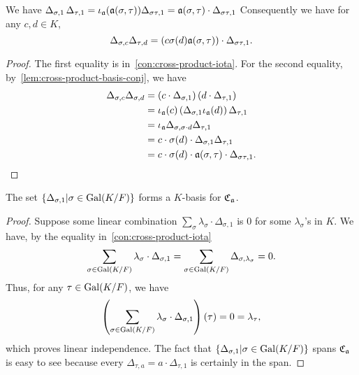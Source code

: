  \begin{lemma}\label{lem:cross-product-basis-mul}
   We have $\Delta_{\sigma,1}\,\Delta_{\tau,1} = \iota_{\mathfrak{a}}(\mathfrak{a}(\sigma,\tau))\Delta_{\sigma\tau,1} = \mathfrak{a}(\sigma,\tau)\cdot\Delta_{\sigma\tau,1}$
   Consequently we have for any $c, d \in K$,
   \[
     \Delta_{\sigma, c}\Delta_{\tau,d} = \left(c \sigma(d)\mathfrak{a}(\sigma,\tau)\right) \cdot \Delta_{\sigma\tau, 1}.
   \]
   \leanok
 \end{lemma}
 \begin{proof}
   The first equality is in~\cref{con:cross-product-iota}.
   For the second equality, by~\cref{lem:cross-product-basis-conj}, we have
   \[
     \begin{aligned}
       \Delta_{\sigma,c}\Delta_{\sigma,d}
       &= \left(c\cdot\Delta_{\sigma, 1}\right)\left(d\cdot\Delta_{\tau,1}\right) \\
       &= \iota_{\mathfrak{a}}(c)\left(\Delta_{\sigma, 1}\iota_{\mathfrak{a}}(d)\right)\Delta_{\tau, 1} \\
       &= \iota_{\mathfrak{a}}\Delta_{\sigma, \sigma \cdot d}\Delta_{\tau, 1}\\
       &= c \cdot \sigma(d) \cdot \Delta_{\sigma, 1}\Delta_{\tau, 1} \\
       &= c \cdot \sigma(d)\cdot\mathfrak{a}(\sigma,\tau)\cdot\Delta_{\sigma\tau,1}.\\
     \end{aligned}
   \]
 \end{proof}


 \begin{lemma}
   \label{lem:cross-product-basis}
   The set $\{\Delta_{\sigma, 1}|\sigma\in\operatorname{Gal}(K/F)\}$ forms a $K$-basis for $\operatorname{\mathfrak{C}}_{\mathfrak{a}}$.
   \leanok
 \end{lemma}
 \begin{proof}
   Suppose some linear combination $\sum_{\sigma}\lambda_{\sigma}\cdot\Delta_{\sigma, 1}$ is $0$ for some $\lambda_{\sigma}$'s in $K$. We have, by the equality in~\cref{con:cross-product-iota}
   \[
       \sum_{\sigma\in\operatorname{Gal}(K/F)}\lambda_{\sigma}\cdot\Delta_{\sigma,1}
       = \sum_{\sigma\in\operatorname{Gal}(K/F)}\Delta_{\sigma,\lambda_{\sigma}} = 0.\\
     \]
     Thus, for any $\tau \in \operatorname{Gal}(K/F)$, we have
     \[
\left(\sum_{\sigma\in\operatorname{Gal}(K/F)}\lambda_{\sigma}\cdot \Delta_{\sigma,1}\right)(\tau) = 0 = \lambda_{\tau},
\]
which proves linear independence. The fact that $\{\Delta_{\sigma, 1}|\sigma\in\operatorname{Gal}(K/F)\}$ spans $\operatorname{\mathfrak{C}}_{\mathfrak{a}}$ is easy to see because every $\Delta_{\tau, a} = a \cdot \Delta_{\tau, 1}$ is certainly in the span.
\end{proof}

